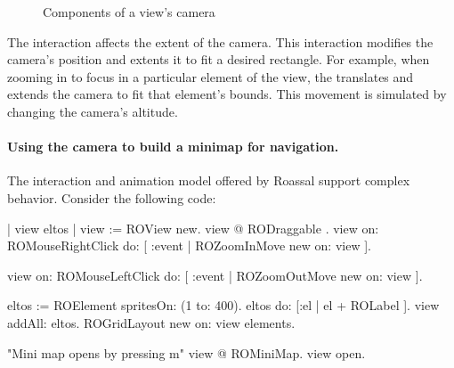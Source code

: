 \documentclass[a4paper,10pt,twoside]{book}
\begin{document}
\begin{figure}[H]
        \centering
		 \hfill
		\hfill
        \caption{Components of a view's camera}\label{fig:cameraDiagram}
\end{figure}

The  interaction affects the extent of the camera. This interaction modifies the camera's position and extents it to fit a desired rectangle. For example, when zooming in to focus in a particular element of the view, the   translates and extends the camera to fit that element's bounds.
This movement is simulated by changing the camera's altitude.

\paragraph{Using the camera to build a minimap for navigation.}
The interaction and animation model offered by Roassal support complex behavior. Consider the following code:

\begin{code}{}
| view eltos |
view := ROView new.
view @ RODraggable .
view on: ROMouseRightClick do: [ :event | 
		ROZoomInMove new on: view ].

view on: ROMouseLeftClick do: [ :event | 
		ROZoomOutMove new on: view ].

eltos := ROElement spritesOn: (1 to: 400).
eltos do:  [:el | el + ROLabel  ].
view addAll: eltos.
ROGridLayout new on: view elements.

"Mini map opens by pressing m"
view @ ROMiniMap.
view open.
\end{code}
\end{document}
